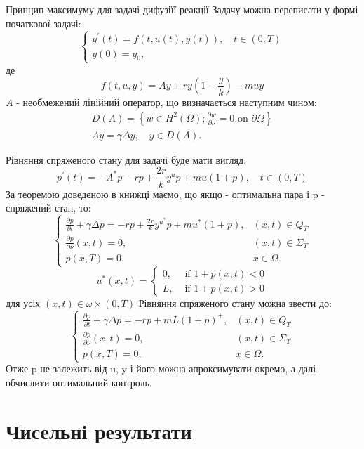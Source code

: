 \documentclass[a4paper,12pt]{extreport}
\begin{document}
Принцип максимуму для задачі дифузіїї реакції
Задачу можна переписати у формі початкової задачі:
$$
\left\{\begin{array}{l}
y^{\prime}(t)=f(t, u(t), y(t)), \quad t \in(0, T) \\
y(0)=y_0,
\end{array}\right.
$$
де
$$
f(t, u, y)=A y+r y\left(1-\frac{y}{k}\right)-m u y
$$
$A$ - необмежений лінійний оператор, що визначається наступним чином:
$$
\begin{gathered}
D(A)=\left\{w \in H^2(\Omega) ; \frac{\partial w}{\partial \nu}=0 \text { on } \partial \Omega\right\} \\
A y=\gamma \Delta y, \quad y \in D(A) .
\end{gathered}
$$

Рівняння спряженого стану для задачі буде мати вигляд:
$$
p^{\prime}(t)=-A^* p-r p+\frac{2 r}{k} y^u p+m u(1+p), \quad t \in(0, T)
$$
За теоремою доведеною в книжці маємо, що якщо - оптимальна пара і p - спряжений стан, то:
$$
\begin{cases}\frac{\partial p}{\partial t}+\gamma \Delta p=-r p+\frac{2 r}{k} y^{u^*} p+m u^*(1+p), & (x, t) \in Q_T \\ \frac{\partial p}{\partial \nu}(x, t)=0, & (x, t) \in \Sigma_T \\ p(x, T)=0, & x \in \Omega\end{cases}
$$
$$
u^*(x, t)= \begin{cases}0, & \text { if } 1+p(x, t)<0 \\ L, & \text { if } 1+p(x, t)>0\end{cases}
$$
для усіх $(x, t) \in \omega \times(0, T)$
Рівняння спряженого стану можна звести до:
$$
\begin{cases}\frac{\partial p}{\partial t}+\gamma \Delta p=-r p+m L(1+p)^{+}, & (x, t) \in Q_T \\ \frac{\partial p}{\partial \nu}(x, t)=0, & (x, t) \in \Sigma_T \\ p(x, T)=0, & x \in \Omega .\end{cases}
$$
Отже p не залежить від u, y і його можна апроксимувати окремо, а далі обчислити оптимальний контроль.
\section{Чисельні результати}
\end{document}
